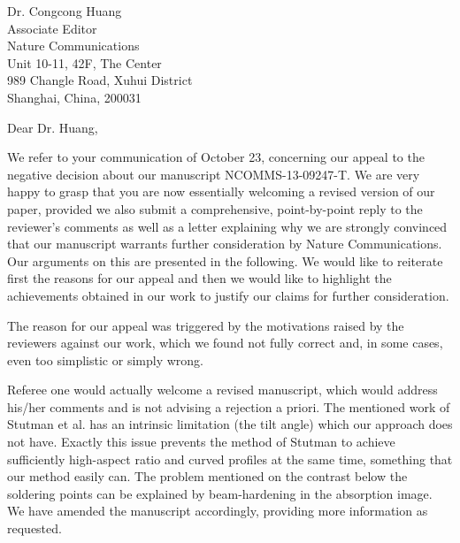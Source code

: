\documentclass[a4paper,english]{scrlttr2}
\date{\today}
\begin{document}
\begin{letter}{Dr. Congcong Huang\\

Associate Editor\\
Nature Communications \\

Unit 10-11, 42F, The Center\\
989 Changle Road, Xuhui District\\
Shanghai, China, 200031}
    \opening{Dear Dr. Huang,}

We refer to your communication of October 23, concerning our appeal to the negative
decision about our manuscript NCOMMS-13-09247-T. We are very happy to grasp that
you are now essentially welcoming a revised version of our paper, provided we also
submit a comprehensive, point-by-point reply to the reviewer’s comments as well as a
letter explaining why we are strongly convinced that our manuscript warrants further
consideration by Nature Communications. Our arguments on this are presented in the
following. We would like to reiterate first the reasons for our appeal and then we would
like to highlight the achievements obtained in our work to justify our claims for further
consideration.

The reason for our appeal was triggered by the motivations raised by the reviewers
against our work, which we found not fully correct and, in some cases, even too
simplistic or simply wrong.

Referee one would actually welcome a revised manuscript, which would address his/her
comments and is not advising a rejection a priori. The mentioned work of Stutman et al.
has an intrinsic limitation (the tilt angle) which our approach does not have. Exactly this
issue prevents the method of Stutman to achieve sufficiently high-aspect ratio and curved
profiles at the same time, something that our method easily can. The problem mentioned
on the contrast below the soldering points can be explained by beam-hardening in the
absorption image. We have amended the manuscript accordingly, providing more
information as requested.


\end{letter}
\end{document}

